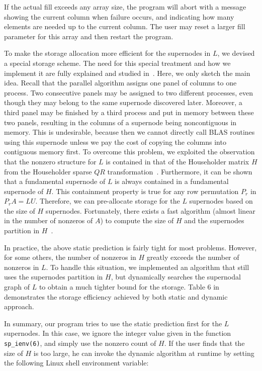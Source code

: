 If the actual fill exceeds any array size, the program will abort with a
message showing the current column when failure occurs, and indicating
how many elements are needed up to the current column. The user
may reset a larger fill parameter for this array and then restart
the program.

To make the storage allocation more efficient for the supernodes in $L$, 
we devised a special storage scheme.
The need for this special treatment and how we implement it are fully
explained and studied in~\cite{superlu_smp99,li96}. Here, we only sketch the
main idea. Recall that the parallel algorithm assigns one panel of columns
to one process.
Two consecutive panels may be assigned to two different processes,
even though they may belong to the same supernode discovered later.
Moreover, a third panel may be
finished by a third process and put in memory between these two panels, 
resulting in the columns of a supernode being noncontiguous in memory. 
This is undesirable, because then we cannot directly call BLAS routines
using this supernode unless we pay the cost of copying the columns
into contiguous memory first. To overcome this problem, we exploited
the observation that the nonzero structure for $L$ is contained
in that of the Householder matrix $H$ from the Householder sparse $QR$
transformation~\cite{georgeliung88,georgeng87}. Furthermore, it can be
shown that a fundamental supernode of $L$ is always contained in
a fundamental supernode of $H$. This containment property is true for
any row permutation $P_r$ in $P_rA = LU$. Therefore, we can pre-allocate 
storage for the $L$ supernodes based on the size of $H$ supernodes.
Fortunately, there exists a fast algorithm (almost linear in the
number of nonzeros of $A$) to compute the size of $H$ and the supernodes 
partition in $H$~\cite{glnp:01}.

In practice, the above static prediction is fairly tight for most problems.
However, for some others, the number of nonzeros in $H$ greatly
exceeds the number of nonzeros in $L$. To handle this situation,
we implemented an algorithm that still uses the supernodes
partition in $H$, but dynamically searches the supernodal graph of $L$
to obtain a much tighter bound for the storage. Table 6 in~\cite{superlu_smp99}
demonstrates the storage efficiency achieved by both static and
dynamic approach.

In summary, our program tries to use the static prediction first
for the $L$ supernodes. 
In this case, we ignore the integer value given in the function
{\tt sp\_ienv(6)}, and simply use the nonzero count of $H$.
If the user finds that the size of $H$ is too large, he can invoke the
dynamic algorithm at runtime by setting the following 
Linux shell environment variable:

